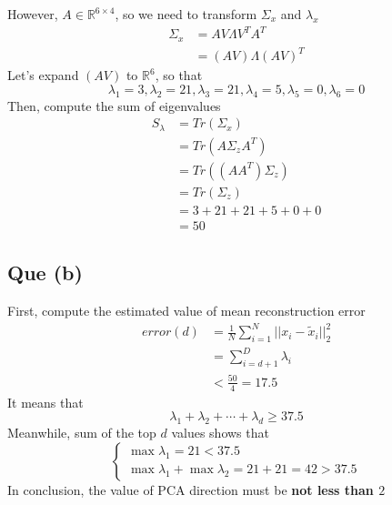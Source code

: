 \documentclass[12pt, letterpaper]{article}
\begin{document}
However, $A\in\mathbb{R}^{6\times 4}$, so we need to transform $\Sigma_x$ and $\lambda_x$
\begin{equation}
\begin{align}
	\Sigma_x
	&= AV\Lambda V^TA^T\\
	&= (AV)\Lambda (AV)^T
\end{align}
\end{equation}
Let's expand $(AV)$ to $\mathbb{R}^6$, so that
\begin{equation}
	\lambda_1=3,
	\lambda_2=21,
	\lambda_3=21,
	\lambda_4=5,
	\lambda_5=0,
	\lambda_6=0
\end{equation}
Then, compute the sum of eigenvalues
\begin{equation}
\begin{align}
	S_\lambda
	&= Tr(\Sigma_x)\\
	&= Tr(A\Sigma_zA^T)\\
	&= Tr((AA^T)\Sigma_z)\\
	&= Tr(\Sigma_z)\\
	&= 3+21+21+5+0+0\\
	&= 50
\end{align}
\end{equation}

\subsection*{Que (b)}
First, compute the estimated value of mean reconstruction error
\begin{equation}
\begin{align}
	error(d)
	&= \frac1N\sum^N_{i=1}||x_i-\tilde{x}_i||^2_2\\
	&= \sum^D_{i=d+1}\lambda_i\\
	&< \frac{50}4=17.5
\end{align}
\end{equation}
It means that
\begin{equation}
	\lambda_1+\lambda_2+\cdots+\lambda_d\geq37.5
\end{equation}
Meanwhile, sum of the top $d$ values shows that
\begin{equation}
\begin{cases}
	\max\lambda_1=21<37.5\\
	\max\lambda_1+\max\lambda_2=21+21=42>37.5
\end{cases}
\end{equation}
In conclusion, the value of PCA direction must be \textbf{not less than $2$}
\end{document}
